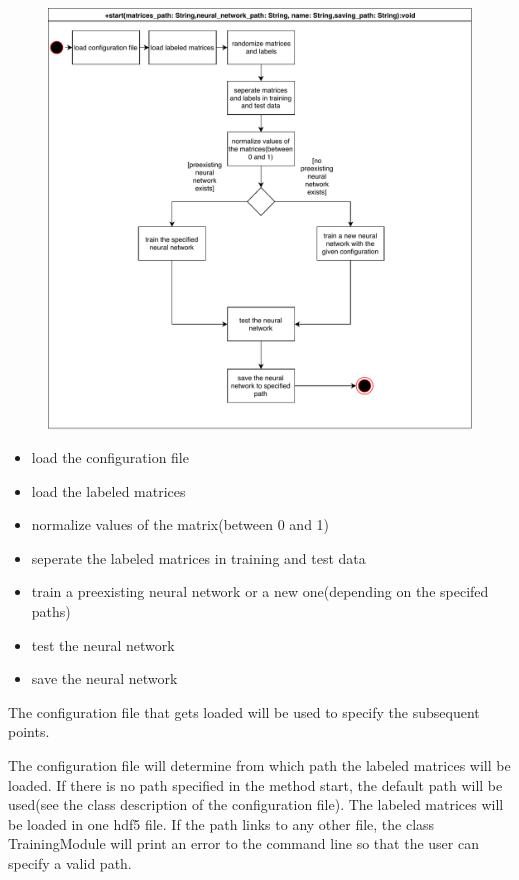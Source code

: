 \documentclass[parskip=full]{scrartcl}
\begin{document}
\begin{figure}[h]
\begin{center}
\includegraphics[scale=0.9]{ActivityDiagrams/PDF/TrainingModule}
\label{Activity Diagrams}
\end{center}
\end{figure}

\begin{itemize}
\item load the configuration file
\item load the labeled matrices
\item normalize values of the matrix(between 0 and 1)
\item seperate the labeled matrices in training and test data
\item train a preexisting neural network or a new one(depending on the specifed paths)
\item test the neural network
\item save the neural network
\end{itemize}

The configuration file that gets loaded will be used to specify the subsequent points.\newline

The configuration file will determine from which path the labeled matrices will be loaded.
If there is no path specified in the method start, the default path will be used(see the class description of the configuration file).
The labeled matrices will be loaded in one hdf5 file. If the path links to any other file, the class TrainingModule will print an error to the command line so that the user can specify a valid path. \newline
\end{document}
